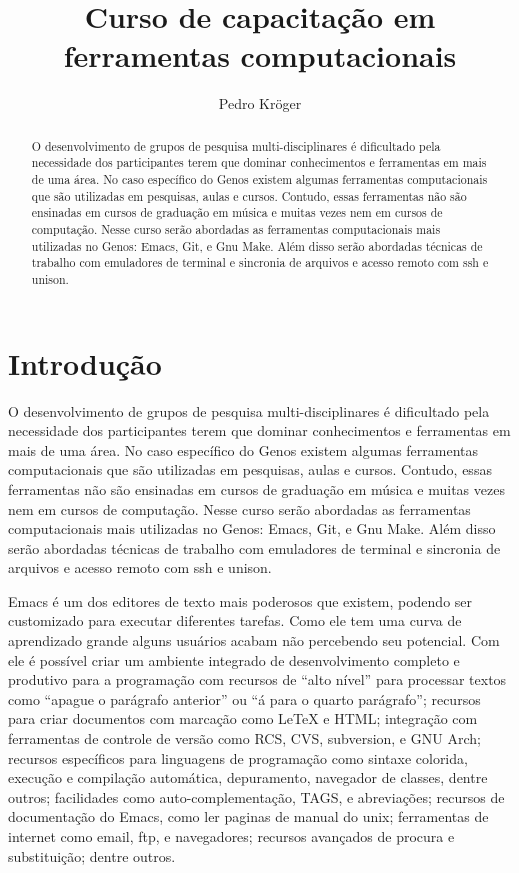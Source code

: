 \documentclass[12pt,brazil]{article}
\begin{document}

\title{Curso de capacitação em ferramentas computacionais}
\author{Pedro Kröger}
\maketitle

\begin{abstract}
  O desenvolvimento de grupos de pesquisa multi-disciplinares é
  dificultado pela necessidade dos participantes terem que dominar
  conhecimentos e ferramentas em mais de uma área. No caso específico
  do Genos existem algumas ferramentas computacionais que são
  utilizadas em pesquisas, aulas e cursos. Contudo, essas ferramentas
  não são ensinadas em cursos de graduação em música e muitas vezes
  nem em cursos de computação. Nesse curso serão abordadas as
  ferramentas computacionais mais utilizadas no Genos: Emacs, Git, e
  Gnu Make. Além disso serão abordadas técnicas de trabalho com
  emuladores de terminal e sincronia de arquivos e acesso remoto com
  ssh e unison.
\end{abstract}

\thispagestyle{empty}

\section{Introdução}

O desenvolvimento de grupos de pesquisa multi-disciplinares é
dificultado pela necessidade dos participantes terem que dominar
conhecimentos e ferramentas em mais de uma área. No caso específico do
Genos existem algumas ferramentas computacionais que são utilizadas em
pesquisas, aulas e cursos. Contudo, essas ferramentas não são
ensinadas em cursos de graduação em música e muitas vezes nem em
cursos de computação. Nesse curso serão abordadas as ferramentas
computacionais mais utilizadas no Genos: Emacs, Git, e Gnu Make. Além
disso serão abordadas técnicas de trabalho com emuladores de terminal
e sincronia de arquivos e acesso remoto com ssh e unison.

Emacs é um dos editores de texto mais poderosos que existem, podendo
ser customizado para executar diferentes tarefas. Como ele tem uma
curva de aprendizado grande alguns usuários acabam não percebendo seu
potencial. Com ele é possível criar um ambiente integrado de
desenvolvimento completo e produtivo para a programação com recursos
de ``alto nível'' para processar textos como ``apague o parágrafo
anterior'' ou ``á para o quarto parágrafo''; recursos para criar
documentos com marcação como LeTeX e HTML; integração com ferramentas
de controle de versão como RCS, CVS, subversion, e GNU Arch; recursos
específicos para linguagens de programação como sintaxe colorida,
execução e compilação automática, depuramento, navegador de classes,
dentre outros; facilidades como auto-complementação, TAGS, e
abreviações; recursos de documentação do Emacs, como ler paginas de
manual do unix; ferramentas de internet como email, ftp, e
navegadores; recursos avançados de procura e substituição; dentre
outros.
\end{document}
